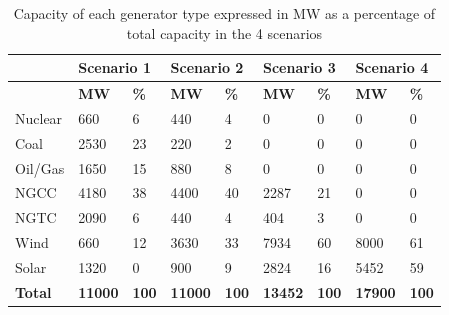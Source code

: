 \documentclass[12pt,LUDisStyle,twosided]{book}
\begin{document}
\begin{table}[h]
\centering
\caption{Capacity of each generator type expressed in MW as a percentage of total capacity in the 4 scenarios}
\label{my-label}
\begin{tabular}{|lllllll|l|l|}
\hline
               & \multicolumn{2}{l}{\textbf{Scenario 1}} & \multicolumn{2}{l}{\textbf{Scenario 2}} & \multicolumn{2}{l|}{\textbf{Scenario 3}} & \multicolumn{2}{l|}{\textbf{Scenario 4}} \\ \hline
               & \textbf{MW}         & \textbf{\%}       & \textbf{MW}         & \textbf{\%}       & \textbf{MW}          & \textbf{\%}       & \textbf{MW}          & \textbf{\%}       \\ \hline
Nuclear        & 660                 & 6                 & 440                 & 4                 & 0                    & 0                 & 0                    & 0                 \\ \hline
Coal           & 2530                & 23                & 220                 & 2                 & 0                    & 0                 & 0                    & 0                 \\ \hline
Oil/Gas        & 1650                & 15                & 880                 & 8                 & 0                    & 0                 & 0                    & 0                 \\ \hline
NGCC           & 4180                & 38                & 4400                & 40                & 2287                 & 21                & 0                    & 0                 \\ \hline
NGTC           & 2090                & 6                 & 440                 & 4                 & 404                  & 3                 & 0                    & 0                 \\ \hline
Wind           & 660                 & 12                & 3630                & 33                & 7934                 & 60                & 8000                 & 61                \\ \hline
Solar          & 1320                & 0                 & 900                 & 9                 & 2824                 & 16                & 5452                 & 59                \\ \hline
\textbf{Total} & \textbf{11000}      & \textbf{100}      & \textbf{11000}      & \textbf{100}      & \textbf{13452}       & \textbf{100}      & \textbf{17900}       & \textbf{100}      \\ \hline
\end{tabular}
\label{table:ScenarioDataDescription}
\end{table}
\end{document}
